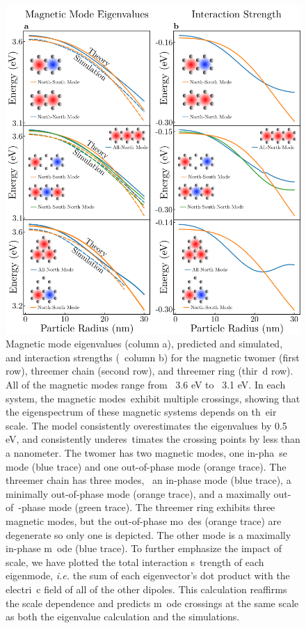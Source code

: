 \documentclass[journal=apchd5,manuscript=article]{achemso}
\begin{document}
\begin{figure}
\centering
\includegraphics[width=.65\paperwidth]{magnetic_mode_eigenvalues_and_interactions.png}
\caption{Magnetic mode eigenvalues (column a), predicted and simulated, and interaction strengths (\
column b) for the magnetic twomer (first row), threemer chain (second row), and threemer ring (thir\
d row). All of the magnetic modes range from ~3.6 eV to ~3.1 eV. In each system, the magnetic modes\
 exhibit multiple crossings, showing that the eigenspectrum of these magnetic systems depends on th\
eir scale. The model consistently overestimates the eigenvalues by 0.5 eV, and consistently underes\
timates the crossing points by less than a nanometer. The twomer has two magnetic modes, one in-pha\
se mode (blue trace) and one out-of-phase mode (orange trace). The threemer chain has three modes, \
an in-phase mode (blue trace), a minimally out-of-phase mode (orange trace), and a maximally out-of\
-phase mode (green trace). The threemer ring exhibits three magnetic modes, but the out-of-phase mo\
des (orange trace) are degenerate so only one is depicted. The other mode is a maximally in-phase m\
ode (blue trace). To further emphasize the impact of scale, we have plotted the total interaction s\
trength of each eigenmode, \textit{i.e.} the sum of each eigenvector's dot product with the electri\
c field of all of the other dipoles. This calculation reaffirms the scale dependence and predicts m\
ode crossings at the same scale as both the eigenvalue calculation and the simulations.}
\label{fig:magmodes}
\end{figure}
\end{document}
